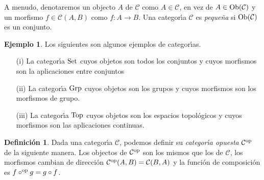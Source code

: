 \documentclass[11pt,a4paper,openright,oneside]{article}
\numberwithin{equation}{section}
\theoremstyle{definition}
\newtheorem{defi}[teo]{Definici\'on}
\newtheorem{ex}[teo]{Ejemplo}
\newcommand{\Set}{\mathop{\rm Set}}
\newcommand{\Grp}{\mathop{\rm Grp}}
\newcommand{\Top}{\mathop{\rm Top}}
\begin{document}
A menudo, denotaremos un objecto $A$ de $\mathcal{C}$ como $A\in \mathcal{C}$, en vez de $A\in{\rm Ob}(\mathcal{C})$ y un morfismo $f\in\mathcal{C}(A,B)$ como $f\colon A\to B$. Una categor\'{\i}a $\mathcal{C}$ es \emph{peque\~na} si ${\rm Ob}(\mathcal{C})$ es un conjunto.
\begin{ex}
    Los siguientes son algunos ejemplos de categor\'{\i}as.
    \begin{enumerate}
        \item[{\rm (i)}] La categor\'{\i}a $\Set$ cuyos objetos son todos los conjuntos y cuyos morfismos son la aplicaciones entre conjuntos
        \item[{\rm (ii)}] La categor\'{\i}a $\Grp$ cuyos objetos son los grupos y cuyos morfismos son los morfismos de grupo.
        \item[{\rm (iii)}] La categor\'{\i}a $\Top$ cuyos objetos son los espacios topol\'ogicos y cuyos morfismos son las aplicaciones continuas.
    \end{enumerate}
\end{ex}

\begin{defi}
    Dada una categor\'{\i}a $\mathcal{C}$, podemos definir su \emph{categor\'{\i}a opuesta} $\mathcal{C}^{\rm op}$ de la siguiente manera. Los objectos de $\mathcal{C}^{\rm{op}}$ son los mismos que los de $\mathcal{C}$, los morfismos cambian de direcci\'on $\mathcal{C}^{\rm op}(A,B)=\mathcal{C}(B,A)$ y la funci\'on de composici\'on es $f\circ^{\rm op}g=g\circ f$.
\end{defi}
\end{document}
